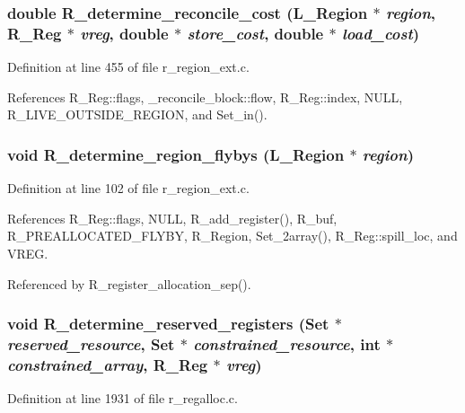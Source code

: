 \subsubsection{\setlength{\rightskip}{0pt plus 5cm}double R\_\-determine\_\-reconcile\_\-cost (L\_\-Region $\ast$ {\em region}, \bf{R\_\-Reg} $\ast$ {\em vreg}, double $\ast$ {\em store\_\-cost}, double $\ast$ {\em load\_\-cost})}\label{r__regproto_8h_f172397e4692dd5aaf09176d9b494c47}




Definition at line 455 of file r\_\-region\_\-ext.c.

References R\_\-Reg::flags, \_\-reconcile\_\-block::flow, R\_\-Reg::index, NULL, R\_\-LIVE\_\-OUTSIDE\_\-REGION, and Set\_\-in().
\subsubsection{\setlength{\rightskip}{0pt plus 5cm}void R\_\-determine\_\-region\_\-flybys (L\_\-Region $\ast$ {\em region})}\label{r__regproto_8h_7d403e367bc00ac823a0a624fe83c60b}




Definition at line 102 of file r\_\-region\_\-ext.c.

References R\_\-Reg::flags, NULL, R\_\-add\_\-register(), R\_\-buf, R\_\-PREALLOCATED\_\-FLYBY, R\_\-Region, Set\_\-2array(), R\_\-Reg::spill\_\-loc, and VREG.

Referenced by R\_\-register\_\-allocation\_\-sep().
\subsubsection{\setlength{\rightskip}{0pt plus 5cm}void R\_\-determine\_\-reserved\_\-registers (\bf{Set} $\ast$ {\em reserved\_\-resource}, \bf{Set} $\ast$ {\em constrained\_\-resource}, int $\ast$ {\em constrained\_\-array}, \bf{R\_\-Reg} $\ast$ {\em vreg})}\label{r__regproto_8h_d15b180b80eabf5ae708060c00827f8f}




Definition at line 1931 of file r\_\-regalloc.c.


